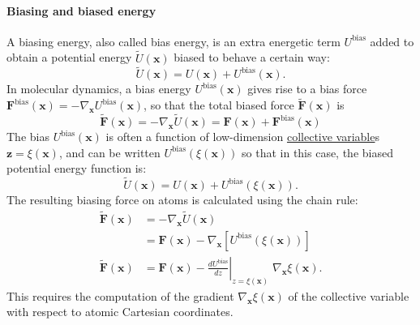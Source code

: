 \documentclass[9pt,review]{livecoms}
\newcommand{\vx}{\mathbf{x}}
\newcommand{\vz}{\mathbf{z}}
\newcommand{\vF}{\mathbf{F}}
\begin{document}
\hypertarget{ref:biasingE} {\paragraph{Biasing and biased energy}}
A biasing energy, also called bias energy, is an extra energetic term $U^\mathrm{bias}$ added to obtain a potential energy $\tilde{U}(\vx)$ biased to behave a certain way:
\begin{equation}
\tilde{U}(\vx) =  U(\vx) + U^\mathrm{bias}(\vx).
\end{equation}
In molecular dynamics, a bias energy
$U^\mathrm{bias}(\vx)$ gives rise to a bias force $\vF^\mathrm{bias}(\vx) = -\nabla_{\vx} U^\mathrm{bias}(\vx)$, so that the total biased force $\tilde{\vF}(\vx)$ is
\begin{equation}
\tilde{\vF}(\vx) = -\nabla_{\vx} \tilde U(\vx) = \vF(\vx) + \vF^\mathrm{bias}(\vx)
\end{equation}
The bias $U^\mathrm{bias}(\vx)$ is often a function of low-dimension \hyperlink{ref:CV} {collective variable}s $\vz = \xi(\vx)$, and can be written $U^\mathrm{bias}(\xi(\vx))$ so that in this case, the biased potential energy function is:
\begin{equation}
\tilde{U}(\vx) =  U(\vx) + U^\mathrm{bias}(\xi(\vx)).
\end{equation}
The resulting biasing force on atoms is calculated using the chain rule:
\begin{align}
\tilde{\vF}(\vx) &= -\nabla_{\vx} \tilde U(\vx) \\
&= \vF(\vx) -\nabla_{\vx} [ U^\mathrm{bias}(\xi(\vx))]\\
\tilde{\vF}(\vx)&= \vF(\vx) - \left . \frac{dU^\mathrm{bias}}{dz}\right |_{z=\xi(\vx)} \; \nabla_{\vx}\xi(\vx).
\end{align}
This requires the computation of the gradient $\nabla_{\vx}\xi(\vx)$ of the collective variable with respect to atomic Cartesian coordinates.
\end{document}
